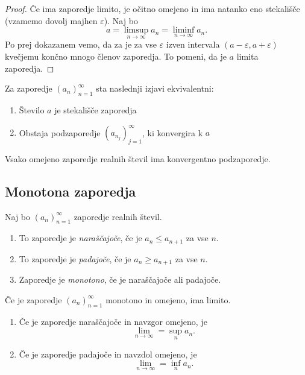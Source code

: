 \documentclass[12pt, a4paper]{article}
\begin{document}
\begin{proof}
Če ima zaporedje limito, je očitno omejeno in ima natanko eno stekališče (vzamemo dovolj majhen $\varepsilon$). Naj bo
\[
a=\limsup_{n\to\infty}a_n=\liminf_{n\to\infty}a_n.
\]
Po prej dokazanem vemo, da za je za vse $\varepsilon$ izven intervala $(a-\varepsilon, a+\varepsilon)$ kvečjemu končno mnogo členov zaporedja. To pomeni, da je $a$ limita zaporedja.
\end{proof}

\begin{izrek}
Za zaporedje $(a_n)_{n=1}^\infty$ sta naslednji izjavi ekvivalentni:

\begin{enumerate}[label=\roman*)]
\item Število $a$ je stekališče zaporedja
\item Obstaja podzaporedje $(a_{n_j})_{j=1}^\infty$, ki konvergira k $a$
\end{enumerate}
\end{izrek}

\obvs

\begin{posledica}
Vsako omejeno zaporedje realnih števil ima konvergentno podzaporedje.
\end{posledica}

\newpage

\subsection{Monotona zaporedja}

\begin{definicija}
Naj bo $(a_n)_{n=1}^\infty$ zaporedje realnih števil.

\begin{enumerate}[label=\roman*)]
\item To zaporedje je \emph{naraščajoče}, če je $a_n\leq a_{n+1}$ za vse $n$.
\item To zaporedje je \emph{padajoče}, če je $a_n\geq a_{n+1}$ za vse $n$.
\item Zaporedje je \emph{monotono}, če je naraščajoče ali padajoče.
\end{enumerate}
\end{definicija}

\begin{izrek}
Če je zaporedje $(a_n)_{n=1}^\infty$ monotono in omejeno, ima limito.

\begin{enumerate}[label=\roman*)]
\item Če je zaporedje naraščajoče in navzgor omejeno, je
\[
\lim_{n\to\infty}=\sup_na_n.
\]
\item Če je zaporedje padajoče in navzdol omejeno, je
\[
\lim_{n\to\infty}=\inf_na_n.
\]
\end{enumerate}
\end{izrek}
\end{document}
